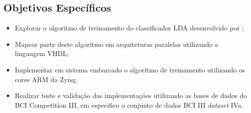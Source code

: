 \subsection{Objetivos Específicos}

\begin{itemize}
	\item Explorar o algoritmo de treinamento do classificador LDA desenvolvido por \cite{F.Lotte};
	\item Mapear parte deste algoritmo em arquiteturas paralelas utilizando a linguagem VHDL;
	\item Implementar em sistema embarcado o algoritmo de treinamento utilizando os cores ARM da Zynq;
	\item Realizar teste e validação das implementações utilizando as bases de dados do BCI Competition III, em especifico o conjunto de dados BCI III \textit{dataset} IVa.
\end{itemize}
